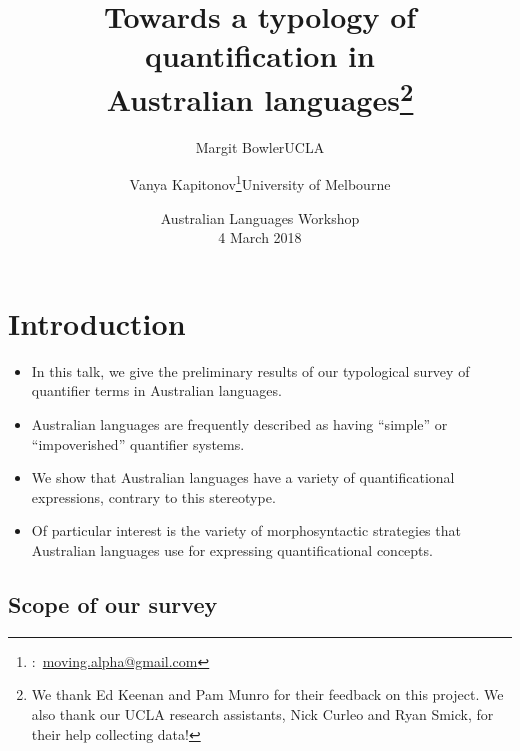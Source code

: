 \documentclass{article}
\title{Towards a typology of quantification in\\ Australian languages\thanks{We thank Ed Keenan and Pam Munro for their feedback on this project. We also thank our UCLA research assistants, Nick Curleo and Ryan Smick, for their help collecting data!}}
\author{Margit Bowler\authorcr UCLA \and \vspace{-.5cm}Vanya Kapitonov\thanks{\Letter:~\href{mailto:moving.alpha@gmail.com}{moving.alpha@gmail.com}}\authorcr University of Melbourne}
\date{Australian Languages Workshop\\4 March 2018}
\begin{document}
\maketitle


\section[Introduction]{Introduction}
\begin{itemize}
    \item In this talk, we give the preliminary results of our typological survey of quantifier terms in Australian languages.
    \item Australian languages are  frequently described as having ``simple'' or ``impoverished'' quantifier systems.%
    \item We show that Australian languages have a variety of quantificational expressions, contrary to this stereotype.
    \item Of particular interest is the variety of morphosyntactic strategies that Australian languages use for expressing quantificational concepts.
\end{itemize}

\subsection{Scope of our survey}
\end{document}
